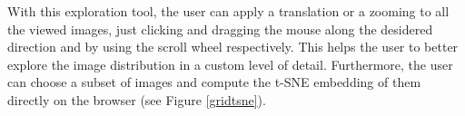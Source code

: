 
With this exploration tool, the user can apply a translation or a zooming to all the viewed images, just clicking and dragging the mouse along the desidered direction and by using the scroll wheel respectively. This helps the user to better explore the image distribution in a custom level of detail.
Furthermore, the user can choose a subset of images and compute the t-SNE embedding of them directly on the browser (see Figure \ref{gridtsne}).%
